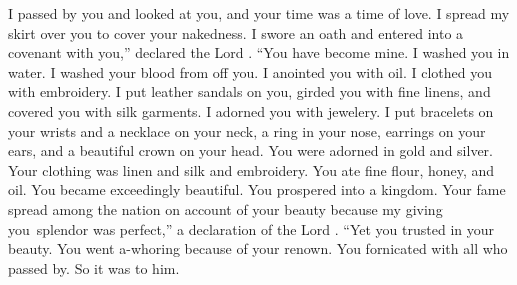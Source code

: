 
\begin{inparaenum}
   I passed by you and looked at you, and your time was a time of love. I spread my skirt over you to cover your nakedness. I swore an oath and entered into a covenant with you,'' declared the Lord \god. ``You have become mine.%
   I washed you in water. I washed your blood from off you. I anointed you with oil.%
   I clothed you with embroidery. I put leather sandals on you, girded you with fine linens, and covered you with silk garments.%
   I adorned you with jewelery. I put bracelets on your wrists and a necklace on your neck,%
   a ring in your nose, earrings on your ears, and a beautiful crown on your head.%
   You were adorned in gold and silver. Your clothing was linen and silk and embroidery. You ate fine flour, honey, and oil. You became exceedingly beautiful. You prospered into a kingdom.%
   Your fame spread among the nation on account of your beauty because my giving you\understood\ splendor was perfect,'' a declaration of the Lord \god.%
   ``Yet you trusted in your beauty. You went a-whoring because of your renown. You fornicated with all who passed by. So it was to him.%
  
  
  
\end{inparaenum}
